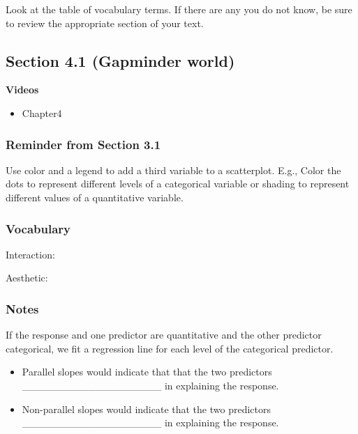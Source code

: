 \documentclass[
]{report}
\providecommand{\tightlist}{%
  \setlength{\itemsep}{0pt}\setlength{\parskip}{0pt}}
\newcommand{\rgs}{\vspace{12pt}} %
\begin{document}
Look at the table of vocabulary terms. If there are any you do not know, be sure to review the appropriate section of your text.

\newpage

\hypertarget{section-4.1-gapminder-world}{%
\subsection*{Section 4.1 (Gapminder world)}\label{section-4.1-gapminder-world}}


\textbf{Videos}

\begin{itemize}
\tightlist
\item
  Chapter4
\end{itemize}


\hypertarget{reminder-from-section-3.1}{%
\subsubsection*{Reminder from Section 3.1}\label{reminder-from-section-3.1}}

Use color and a legend to add a third variable to a scatterplot. E.g., Color the dots to represent different levels of a categorical variable or shading to represent different values of a quantitative variable.

\hypertarget{vocabulary-9}{%
\subsubsection*{Vocabulary}\label{vocabulary-9}}

Interaction:
\rgs

Aesthetic:
\rgs

\hypertarget{notes-12}{%
\subsubsection*{Notes}\label{notes-12}}

If the response and one predictor are quantitative and the other predictor categorical, we fit a regression line for each level of the categorical predictor.

\begin{itemize}
\item
  Parallel slopes would indicate that that the two predictors \_\_\_\_\_\_\_\_\_\_\_\_\_\_\_\_\_\_\_ in explaining the response.
\item
  Non-parallel slopes would indicate that the two predictors \_\_\_\_\_\_\_\_\_\_\_\_\_\_\_\_\_\_\_ in explaining the response.
\end{itemize}
\end{document}
